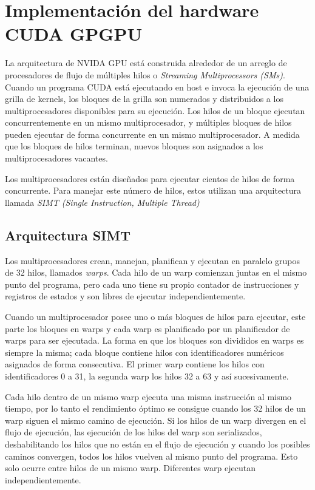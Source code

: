 \documentclass[a4paper,openright,12pt, oneside]{book}
\begin{document}
\section{Implementaci\'on del hardware CUDA GPGPU}

La arquitectura de NVIDA GPU est\'a construida alrededor de un arreglo de
procesadores de flujo de m\'ultiples hilos o \textit{Streaming Multiprocessors (SMs)}.
Cuando un programa CUDA est\'a ejecutando en host e invoca la ejecuci\'on de una grilla
de kernels, los bloques de la grilla son numerados y distribuidos a los multiprocesadores
disponibles para su ejecuci\'on. Los hilos de un bloque ejecutan concurrentemente en
un mismo multiprocesador, y m\'ultiples bloques de hilos pueden ejecutar de forma
concurrente en un mismo multiprocesador. A medida que los bloques de hilos terminan,
nuevos bloques son asignados a los multiprocesadores vacantes.

Los multiprocesadores est\'an dise\~nados para ejecutar cientos de hilos de forma concurrente. 
Para manejar este n\'umero de hilos, estos utilizan una arquitectura llamada 
\textit{SIMT (Single Instruction, Multiple Thread)}


\subsection{Arquitectura SIMT}

Los multiprocesadores crean, manejan, planifican y ejecutan en paralelo grupos de 32 hilos,
llamados \textit{warps}. Cada hilo de un warp comienzan juntas en el mismo punto del
programa, pero cada uno tiene su propio contador de instrucciones y registros de estados
y son libres de ejecutar independientemente.

Cuando un multiprocesador posee uno o m\'as bloques de hilos para ejecutar, este
parte los bloques en warps y cada warp es planificado por un planificador de warps para ser ejecutada. 
La forma en que los bloques son divididos en warps es siempre la misma; cada bloque contiene
hilos con identificadores num\'ericos asignados de forma consecutiva. El primer warp contiene
los hilos con identificadores 0 a 31, la segunda warp los hilos 32 a 63 y as\'i sucesivamente.

Cada hilo dentro de un mismo warp ejecuta una misma instrucci\'on al mismo tiempo, por lo tanto el rendimiento
\'optimo se consigue cuando los 32 hilos de un warp siguen el mismo camino de ejecuci\'on.
Si los hilos de un warp divergen en el flujo de ejecuci\'on, las ejecuci\'on de los 
hilos del warp son serializados, deshabilitando los hilos que no est\'an en el flujo
de ejecuci\'on y cuando los posibles caminos convergen, todos los hilos vuelven
al mismo punto del programa. Esto solo ocurre entre hilos de un mismo warp. Diferentes
warp ejecutan independientemente.
\end{document}
